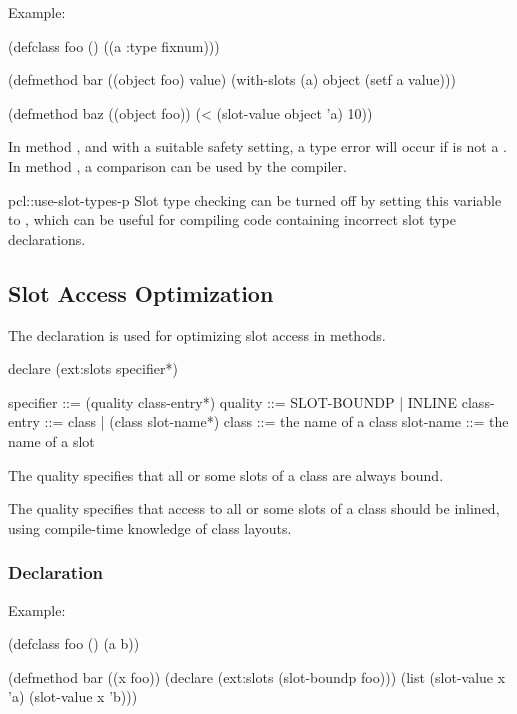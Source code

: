 Example:

\begin{example}
(defclass foo ()
  ((a :type fixnum)))

(defmethod bar ((object foo) value)
  (with-slots (a) object
    (setf a value)))

(defmethod baz ((object foo))
  (< (slot-value object 'a) 10))
\end{example}

In method , and with a suitable safety setting, a type error
will occur if  is not a .  In method
, a  comparison can be used by the compiler.
  
\begin{defvar}{pcl::}{use-slot-types-p}
  Slot type checking can be turned off by setting this variable to
  \false, which can be useful for compiling code containing incorrect
  slot type declarations.
\end{defvar}


\subsection{Slot Access Optimization}

The declaration  is used for optimizing slot access in
methods.

\begin{example}
declare (ext:slots specifier*)

specifier   ::= (quality class-entry*)
quality     ::= SLOT-BOUNDP | INLINE
class-entry ::= class | (class slot-name*)
class       ::= the name of a class
slot-name   ::= the name of a slot
\end{example}

The  quality specifies that all or some slots of a
class are always bound.

The  quality specifies that access to all or some slots
of a class should be inlined, using compile-time knowledge of class
layouts.



\subsubsection{ Declaration}

Example:

\begin{example}
(defclass foo ()
  (a b))

(defmethod bar ((x foo))
  (declare (ext:slots (slot-boundp foo)))
  (list (slot-value x 'a) (slot-value x 'b)))
\end{example}

